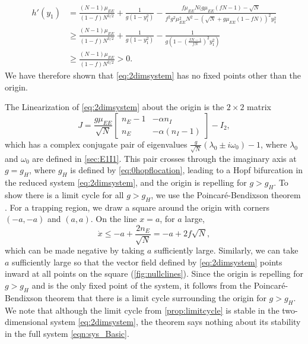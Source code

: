 \documentclass[reqno]{siamonline190516}
\begin{document}
\begin{equation*}\label{eq:hprime}
\begin{aligned}
h'(y_1) &= 
\frac{(N-1)\mu_{EE}}{(1-f) N^{3/2} } + \frac{1}{g(1 - y_1^2)} 
- \frac{
 f \mu_{EE} N ( g \mu_{EE} ( f N - 1) - \sqrt{N}}{f^2 g^2 \mu_{EE}^2 N^2 - (\sqrt{N} + 
 g \mu_{EE}(1 - f N))^2 y_1^2} \\
 &\geq \frac{(N-1)\mu_{EE}}{(1-f) N^{3/2} } + \frac{1}{g(1 - y_1^2)} 
- \frac{1}{g \left( 1 - \left( \frac{ f N - 1}{f N} \right)^2 y_1^2 \right)} \\
&\geq \frac{(N-1)\mu_{EE}}{(1-f) N^{3/2} } > 0.
\end{aligned}
\end{equation*}
We have therefore shown that \cref{eq:2dimsystem} has no fixed points other than the origin.

The Linearization of \cref{eq:2dimsystem} about the origin is the $2 \times 2$ matrix
\[
J = \frac{g \mu_{EE}}{\sqrt{N}}
\begin{bmatrix} 
n_E - 1 & -\alpha n_I \\
n_E & -\alpha(n_I - 1)
\end{bmatrix} - I_2,
\]
which has a complex conjugate pair of eigenvalues $\frac{g}{\sqrt{N}}(\lambda_0 \pm i \omega_0) - 1$, where $\lambda_0$ and $\omega_0$ are defined in \cref{sec:E1I1}. This pair crosses through the imaginary axis at $g = g_H$, where $g_H$ is defined by \cref{eq:0hopflocation}, leading to a Hopf bifurcation in the reduced system \cref{eq:2dimsystem}, and the origin is repelling for $g > g_H$. To show there is a limit cycle for all $g > g_H$, we use the Poincar{\'e}-Bendixson theorem \cite[Chapter 16]{Coddington1955}. For a trapping region, we draw a square around the origin with corners $(-a, -a)$ and $(a, a)$. On the line $x = a$, for $a$ large,
\[
\dot{x} \leq -a + \frac{2 n_E}{\sqrt{N}} = -a + 2 f \sqrt{N},
\]
which can be made negative by taking $a$ sufficiently large. Similarly, we can take $a$ sufficiently large so that the vector field defined by \cref{eq:2dimsystem} points inward at all points on the square (\cref{fig:nullclines}). Since the origin is repelling for $g > g_H$ and is the only fixed point of the system, it follows from the Poincar{\'e}-Bendixson theorem that there is a limit cycle surrounding the origin for $g > g_H$. We note that although the limit cycle from \cref{prop:limitcycle} is stable in the two-dimensional system \cref{eq:2dimsystem}, the theorem says nothing about its stability in the full system \cref{eqn:sys_Basic}.
\end{document}
